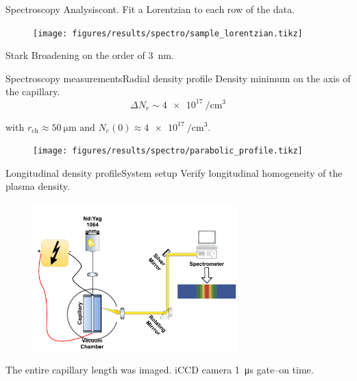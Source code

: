 \documentclass[dvipsnames]{beamer}
\begin{document}
\begin{frame}{Spectroscopy Analysis}{cont.}
Fit a Lorentzian to each row of the data.
\begin{figure}
  \texttt{[image: figures/results/spectro/sample\_lorentzian.tikz]}
\end{figure}
Stark Broadening on the order of \SI{3}{\nm}.
\end{frame}
\begin{frame}{Spectroscopy measurements}{Radial density profile}
 {\small Density minimum on the axis of the capillary.}
 \begin{equation*}
\Delta N_e \sim \SI{4e17}{\per \cubic \cm}
 \end{equation*}
\begin{center}
 with $r_\text{ch}\approx \SI{50}{\um} \text{ and } N_e\left(0\right)\approx \SI{4e17}{\per\cubic\cm}.$
\end{center}
\begin{figure}
\texttt{[image: figures/results/spectro/parabolic\_profile.tikz]}
\end{figure}
\end{frame}
\begin{frame}{Longitudinal density profile}{System setup}
 {\small Verify longitudinal homogeneity of the plasma density.}
 \begin{figure}
\includegraphics[width=0.7\textwidth]{figures/results/spectro/longitudinal_system.pdf}
 \end{figure}
 The entire capillary length was imaged.
 iCCD camera \SI{1}{\us} gate--on time.
\end{frame}
\end{document}
